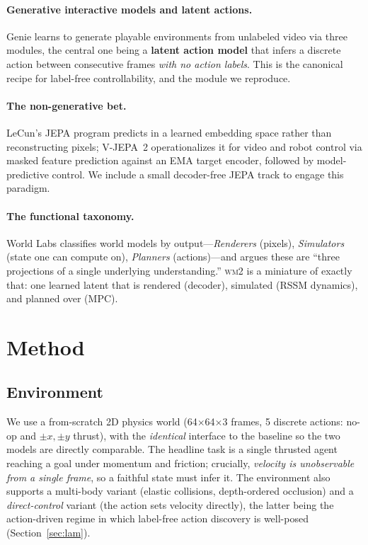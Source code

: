\documentclass[11pt]{article}
\newcommand{\wmtwo}{\textsc{wm2}}
\begin{document}
\paragraph{Generative interactive models and latent actions.} Genie
\cite{genie2024} learns to generate playable environments from unlabeled video via
three modules, the central one being a \textbf{latent action model} that infers a
discrete action between consecutive frames \emph{with no action labels}. This is the
canonical recipe for label-free controllability, and the module we reproduce.

\paragraph{The non-generative bet.} LeCun's JEPA program \cite{lecun2022path}
predicts in a learned embedding space rather than reconstructing pixels; V-JEPA~2
\cite{vjepa2} operationalizes it for video and robot control via masked feature
prediction against an EMA target encoder, followed by model-predictive control. We
include a small decoder-free JEPA track to engage this paradigm.

\paragraph{The functional taxonomy.} World Labs \cite{worldlabs2026taxonomy}
classifies world models by output---\emph{Renderers} (pixels), \emph{Simulators}
(state one can compute on), \emph{Planners} (actions)---and argues these are ``three
projections of a single underlying understanding.'' \wmtwo{} is a miniature of
exactly that: one learned latent that is rendered (decoder), simulated (RSSM
dynamics), and planned over (MPC).

\section{Method}
\label{sec:method}

\subsection{Environment}
We use a from-scratch 2D physics world (64$\times$64$\times$3 frames, 5 discrete
actions: no-op and $\pm x,\pm y$ thrust), with the \emph{identical} interface to the
baseline so the two models are directly comparable. The headline task is a single
thrusted agent reaching a goal under momentum and friction; crucially, \emph{velocity
is unobservable from a single frame}, so a faithful state must infer it. The
environment also supports a multi-body variant (elastic collisions, depth-ordered
occlusion) and a \emph{direct-control} variant (the action sets velocity directly),
the latter being the action-driven regime in which label-free action discovery is
well-posed (Section~\ref{sec:lam}).
\end{document}
